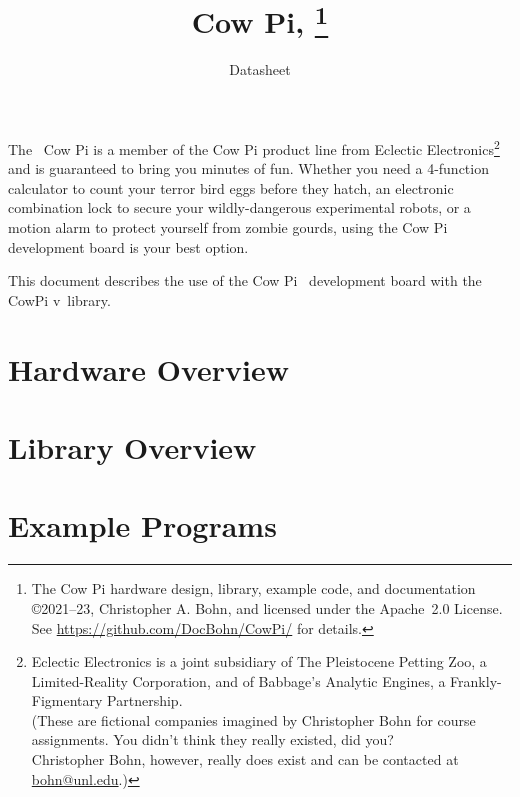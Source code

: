 \documentclass[12pt]{article}
\begin{document}
    \pagestyle{fancy}
    \fancyhf{}
    \cfoot{\thepage}
    \title{Cow Pi, \hardwareversion\footnote{The Cow Pi hardware design, library, example code, and documentation \\ \copyright 2021--23, Christopher A. Bohn\tiny{, and licensed under the Apache~2.0 License. See \url{https://github.com/DocBohn/CowPi/} for details.}}}
    \author{Datasheet}
    \date{}
    \maketitle

    The \hardwareversion\ Cow Pi is a member of the Cow Pi product line from Eclectic Electronics\footnote{
        Eclectic Electronics is a joint subsidiary of The Pleistocene Petting Zoo, a Limited-Reality Corporation, and of Babbage's Analytic Engines, a Frankly-Figmentary Partnership. \\
        \tiny{(These are fictional companies imagined by Christopher Bohn for course assignments. You didn't think they really existed, did you? \\ Christopher Bohn, however, really does exist and can be contacted at \href{mailto:bohn@unl.edu}{bohn@unl.edu}.)}
    }
    and is guaranteed to bring you minutes of fun.
    Whether you need a 4-function calculator to count your terror bird eggs before they hatch, an electronic combination lock to secure your wildly-dangerous experimental robots, or a motion alarm to protect yourself from zombie gourds, using the Cow Pi development board is your best option.

    This document describes the use of the Cow Pi \cowpiversion\ development board with the CowPi v\softwareversion\ library.

    \tableofcontents


    \section{Hardware Overview} 

    \section{Library Overview} 

    \section{Example Programs} 
\end{document}
